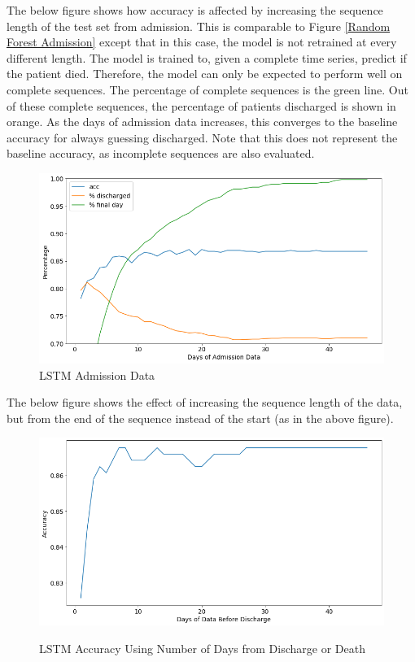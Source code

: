 \documentclass[12pt]{article}
\begin{document}
The below figure shows how accuracy is affected by increasing the sequence length of the test set from admission. This is comparable to Figure \ref{Random Forest Admission} except that in this case, the model is not retrained at every different length. 
The model is trained to, given a complete time series, predict if the patient died. Therefore, the model can only be expected to perform well on complete sequences. The percentage of complete sequences is the green line. Out of these complete sequences, the percentage of patients discharged is shown in orange. As the days of admission data increases, this converges to the baseline accuracy for always guessing discharged. Note that this does not represent the baseline accuracy, as incomplete sequences are also evaluated. 
\begin{figure}[H]
\centering\caption{LSTM Admission Data}
\includegraphics[scale=0.4]{LSTM Admission Data.png}
\end{figure}

The below figure shows the effect of increasing the sequence length of the data, but from the end of the sequence instead of the start (as in the above figure).

\begin{figure}[H]
\centering\caption{LSTM Accuracy Using Number of Days from Discharge or Death}
\includegraphics[scale=0.4]{LSTM Accuracy Using Number of Days from Discharge or Death.png}
\label{LSTM Accuracy Using Number of Days from Discharge or Death}
\end{figure}
\end{document}
